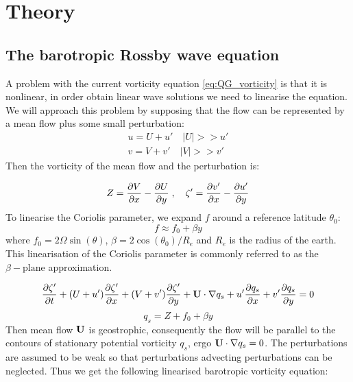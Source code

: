 \section{Theory}
\subsection{The barotropic Rossby wave equation}
A problem with the current vorticity equation \cref{eq:QG_vorticity} is
that it is nonlinear, in order obtain linear wave solutions we need to linearise
the equation. We will approach this problem by supposing that the flow can be
represented by a mean flow plus some small perturbation:
\begin{equation}\label{eq:VeloctiyPertubation}
    \begin{split}
    u = U + u' \quad  |U| >> u' \\
    v = V + v' \quad  |V| >> v'
    \end{split}
\end{equation}
Then the vorticity of the mean flow and the perturbation is:

\begin{equation}\label{eq:VortPertubation}
    Z = \pdv{V}{x} - \pdv{U}{y} \; , \quad \zeta' = \pdv{v'}{x} - \pdv{u'}{y}
\end{equation}
To linearise the Coriolis parameter, we expand $f$
around a reference latitude $\theta_0$:
\begin{equation}
    f \approx f_0 + \beta y
\end{equation}
where $f_0 = 2\Omega \sin(\theta)$, $\beta = 2\cos (\theta_0)/R_e$ and $R_e$ is
the radius of the earth. This linearisation of the Coriolis parameter is
commonly referred to as the $\beta-\mathrm{plane}$ approximation.

\begin{equation}
    \pdv{\zeta'}{t} + (U+u')\pdv{\zeta'}{x} + (V+v')\pdv{\zeta'}{y} + \mathbf{U}
    \cdot \nabla q_s + u' \pdv{q_s}{x} + v' \pdv{q_s}{y} = 0
\end{equation}
\begin{equation}\label{eq:q_s}
    q_s = Z + f_0 + \beta y
\end{equation}
Then mean flow $\mathbf{U}$ is geostrophic, consequently the flow will be parallel
to the contours of stationary potential vorticity $q_s$, ergo $\mathbf{U} \cdot
\nabla q_s = 0$. The perturbations are assumed to be weak so that perturbations
advecting perturbations can be neglected. Thus we get the following linearised
barotropic vorticity equation:


